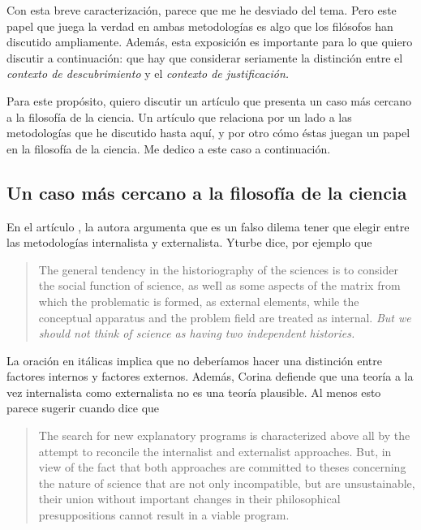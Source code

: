 Con esta breve caracterización, parece que me he desviado del tema.
Pero este papel que juega la verdad en ambas metodologías es algo que los filósofos han discutido ampliamente.
Además, esta exposición es importante para lo que quiero discutir a continuación: que hay que considerar seriamente la distinción entre el \emph{contexto de descubrimiento} y el \emph{contexto de justificación.}

Para este propósito, quiero discutir un artículo que presenta un caso más cercano a la filosofía de la ciencia.
Un artículo que relaciona por un lado a las metodologías que he discutido hasta aquí, y por otro cómo éstas juegan un papel en la filosofía de la ciencia.
Me dedico a este caso a continuación.

\subsection{Un caso más cercano a la filosofía de la ciencia}\label{sbc:yturbe}

\noindent En el artículo , la autora argumenta que es un falso dilema tener que elegir entre las metodologías internalista y externalista.
Yturbe dice, por ejemplo que

\begin{quote}
	The general tendency in the historiography of the sciences is to consider the social function of science, as weIl as some aspects of the matrix from which the problematic is formed, as external elements, while the conceptual apparatus and the problem field are treated as internal. \emph{But we should not think of science as having two independent histories.} \parencite[p.85, Énfasis agregado]{Yturbe1995}
\end{quote}

La oración en itálicas implica que no deberíamos hacer una distinción entre factores internos y factores externos.
Además, Corina defiende que una teoría a la vez internalista como externalista no es una teoría plausible.
Al menos esto parece sugerir cuando dice que

\begin{quote}
	The search for new explanatory programs is characterized above all by the attempt to reconcile the internalist and externalist approaches.
	But, in view of the fact that both approaches are committed to theses concerning the nature of science that are not only incompatible, but are unsustainable, their union without important changes in their philosophical presuppositions cannot result in a viable program. \parencite[p. 79]{Yturbe1995}
\end{quote}

